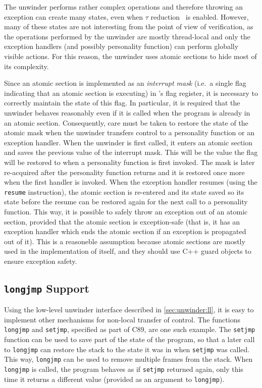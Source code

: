 The unwinder performs rather complex operations and therefore throwing
an exception can create many states, even when $\tau$
reduction~ is enabled. However, many of
these states are not interesting from the point of view of verification,
as the operations performed by the unwinder are mostly thread-local and
only the exception handlers (and possibly personality function) can
perform globally visible actions. For this reason, the unwinder uses
\dios{} atomic sections to hide most of its complexity.

Since an atomic section is implemented as an \emph{interrupt mask}
(i.e.~a single flag indicating that an atomic section is executing) in
\divm{}'s flag register, it is necessary to correctly maintain the state of
this flag.
In
particular, it is required that the unwinder behaves reasonably even if
it is called when the program is already in an atomic section.
Consequently, care must be taken to restore the state of the atomic mask
when the unwinder transfers control to a personality function or an
exception handler. When the unwinder is first called, it enters an
atomic section and saves the previous value of the interrupt mask. This
will be the value the flag will be restored to when a personality
function is first invoked. The mask is later re-acquired after the
personality function returns and it is restored once more when the first
handler is invoked. When the exception handler resumes (using the
\texttt{resume} instruction), the atomic section is re-entered and its
state saved so its state before the resume can be restored again for the
next call to a personality function. This way, it is possible to safely
throw an exception out of an atomic section, provided that the atomic
section is exception-safe (that is, it has an exception handler which
ends the atomic section if an exception is propagated out of it).
This is a reasoneble assumption because atomic sections are mostly used in the
implementation of \dios itself, and they should use C++ guard objects to ensure
exception safety.

\subsection{\texorpdfstring{\texttt{longjmp} Support}{longjmp Support}}\label{sec:lang:longjmp-support}

Using the low-level unwinder interface described in
\autoref{sec:unwinder:ll}, it is easy to implement other mechanisms
for non-local transfer of control. The functions \texttt{longjmp} and
\texttt{setjmp}, specified as part of C89, are one such
example.
The \texttt{setjmp}
function can be used to save part of the state of the program, so that a
later call to \texttt{longjmp} can restore the stack to the state it was
in when \texttt{setjmp} was called. This way, \texttt{longjmp} can be
used to remove multiple frames from the stack. When \texttt{longjmp} is
called, the program behaves as if \texttt{setjmp} returned again, only
this time it returns a different value (provided as an argument to
\texttt{longjmp}).

